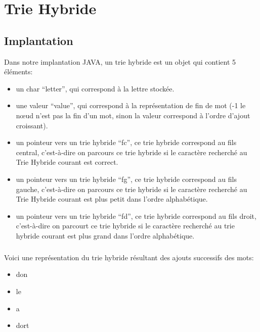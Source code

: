 \documentclass[a4paper,12pt]{report}
\begin{document}
\chapter{Trie Hybride}
\section{Implantation}
Dans notre implantation JAVA, un trie hybride est un objet qui contient 5 éléments:
\begin{itemize}
 \item un char ``letter'', qui correspond à la lettre stockée.
 \item une valeur ``value'', qui correspond à la représentation de fin de mot (-1 le nœud n'est pas la fin
 d'un mot, sinon la valeur correspond à l'ordre d'ajout croissant).
 \item un pointeur vers un trie hybride ``fc'', ce trie hybride correspond au fils central, c'est-à-dire on parcours ce
 trie hybride si le caractère recherché au Trie Hybride courant est correct.
 \item un pointeur vers un trie hybride ``fg'', ce trie hybride correspond au fils gauche, c'est-à-dire on parcours ce
 trie hybride si le caractère recherché au Trie Hybride courant est plus petit dans l'ordre alphabétique.
 \item un pointeur vers un trie hybride ``fd'', ce trie hybride correspond au fils droit, c'est-à-dire on parcourt ce
 trie hybride si le caractère recherché au trie hybride courant est plus grand dans l'ordre alphabétique.
\end{itemize}

\paragraph*{}
Voici une représentation du trie hybride résultant des ajouts successifs des mots:
\begin{itemize}
 \item don
 \item le
 \item a
 \item dort
\end{itemize}
\end{document}
